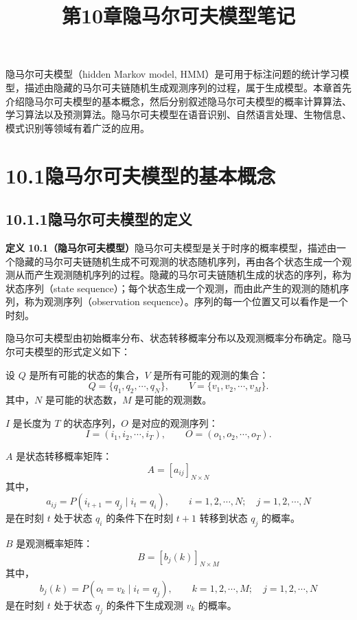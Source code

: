 \documentclass[UTF8,12pt,a4paper,fontset=fandol]{ctexart}
\title{第10章\quad 隐马尔可夫模型笔记}
\author{}
\date{}
\begin{document}
\maketitle

隐马尔可夫模型（hidden Markov model, HMM）是可用于标注问题的统计学习模型，描述由隐藏的马尔可夫链随机生成观测序列的过程，属于生成模型。本章首先介绍隐马尔可夫模型的基本概念，然后分别叙述隐马尔可夫模型的概率计算算法、学习算法以及预测算法。隐马尔可夫模型在语音识别、自然语言处理、生物信息、模式识别等领域有着广泛的应用。

\section*{10.1\quad 隐马尔可夫模型的基本概念}

\subsection*{10.1.1\quad 隐马尔可夫模型的定义}

\noindent\textbf{定义 10.1（隐马尔可夫模型）}\quad 隐马尔可夫模型是关于时序的概率模型，描述由一个隐藏的马尔可夫链随机生成不可观测的状态随机序列，再由各个状态生成一个观测从而产生观测随机序列的过程。隐藏的马尔可夫链随机生成的状态的序列，称为状态序列（state sequence）；每个状态生成一个观测，而由此产生的观测的随机序列，称为观测序列（observation sequence）。序列的每一个位置又可以看作是一个时刻。

隐马尔可夫模型由初始概率分布、状态转移概率分布以及观测概率分布确定。隐马尔可夫模型的形式定义如下：

设 $Q$ 是所有可能的状态的集合，$V$ 是所有可能的观测的集合：
\[
  Q=\{q_1,q_2,\cdots,q_N\},\qquad
  V=\{v_1,v_2,\cdots,v_M\}.
\]
其中，$N$ 是可能的状态数，$M$ 是可能的观测数。

$I$ 是长度为 $T$ 的状态序列，$O$ 是对应的观测序列：
\[
  I=(i_1,i_2,\cdots,i_T),\qquad
  O=(o_1,o_2,\cdots,o_T).
\]

$A$ 是状态转移概率矩阵：
\begin{equation}
  A=[a_{ij}]_{N\times N}
  \tag{10.1}
\end{equation}
其中，
\begin{equation}
  a_{ij}=P(i_{t+1}=q_j\mid i_t=q_i),\qquad
  i=1,2,\cdots,N;\quad j=1,2,\cdots,N
  \tag{10.2}
\end{equation}
是在时刻 $t$ 处于状态 $q_i$ 的条件下在时刻 $t+1$ 转移到状态 $q_j$ 的概率。

$B$ 是观测概率矩阵：
\begin{equation}
  B=[b_j(k)]_{N\times M}
  \tag{10.3}
\end{equation}
其中，
\begin{equation}
  b_j(k)=P(o_t=v_k\mid i_t=q_j),\qquad
  k=1,2,\cdots,M;\quad j=1,2,\cdots,N
  \tag{10.4}
\end{equation}
是在时刻 $t$ 处于状态 $q_j$ 的条件下生成观测 $v_k$ 的概率。
\end{document}
